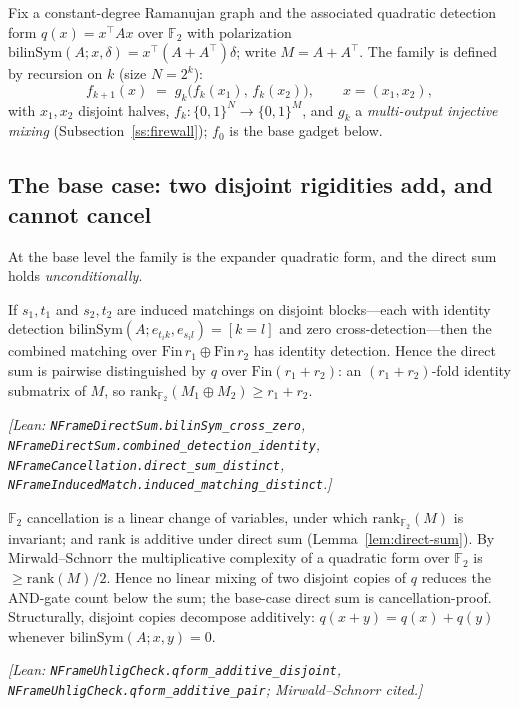 Fix a constant-degree Ramanujan graph and the associated quadratic detection form
$q(x)=x^\top A x$ over $\mathbb F_2$ with polarization
$\mathrm{bilinSym}(A;x,\delta)=x^\top(A{+}A^\top)\delta$; write $M=A+A^\top$.  The
family is defined by recursion on $k$ (size $N=2^{k}$):
\[
  f_{k+1}(x) \;=\; g_{k}\!\bigl(f_{k}(x_{1}),\,f_{k}(x_{2})\bigr),
  \qquad x=(x_{1},x_{2}),
\]
with $x_1,x_2$ disjoint halves, $f_k:\{0,1\}^{N}\to\{0,1\}^{M}$, and $g_k$ a
\emph{multi-output injective mixing} (Subsection~\ref{ss:firewall}); $f_0$ is the
base gadget below.

\subsection{The base case: two disjoint rigidities add, and cannot cancel}

At the base level the family is the expander quadratic form, and the direct sum
holds \emph{unconditionally}.

\begin{lemma}
\label{lem:direct-sum}
If $s_1,t_1$ and $s_2,t_2$ are induced matchings on disjoint blocks---each with
identity detection $\mathrm{bilinSym}(A;e_{t_i k},e_{s_i l})=[k{=}l]$ and zero
cross-detection---then the combined matching over $\mathrm{Fin}\,r_1\oplus
\mathrm{Fin}\,r_2$ has identity detection.  Hence the direct sum is pairwise
distinguished by $q$ over $\mathrm{Fin}(r_1{+}r_2)$: an $(r_1{+}r_2)$-fold identity
submatrix of $M$, so $\mathrm{rank}_{\mathbb F_2}(M_1\oplus M_2)\ge r_1+r_2$.
\end{lemma}
\noindent\emph{[Lean: \texttt{NFrameDirectSum.bilinSym\_cross\_zero},
\texttt{NFrameDirectSum.combined\_detection\_identity},
\texttt{NFrameCancellation.direct\_sum\_distinct},
\texttt{NFrameInducedMatch.induced\_matching\_distinct}.]}

\begin{lemma}
\label{lem:cancellation}
$\mathbb F_2$ cancellation is a linear change of variables, under which
$\mathrm{rank}_{\mathbb F_2}(M)$ is invariant; and $\mathrm{rank}$ is additive
under direct sum (Lemma~\ref{lem:direct-sum}).  By Mirwald--Schnorr the
multiplicative complexity of a quadratic form over $\mathbb F_2$ is
$\ge \mathrm{rank}(M)/2$.  Hence no linear mixing of two disjoint copies of $q$
reduces the AND-gate count below the sum; the base-case direct sum is
cancellation-proof.  Structurally, disjoint copies decompose additively:
$q(x{+}y)=q(x)+q(y)$ whenever $\mathrm{bilinSym}(A;x,y)=0$.
\end{lemma}
\noindent\emph{[Lean: \texttt{NFrameUhligCheck.qform\_additive\_disjoint},
\texttt{NFrameUhligCheck.qform\_additive\_pair}; Mirwald--Schnorr cited.]}

